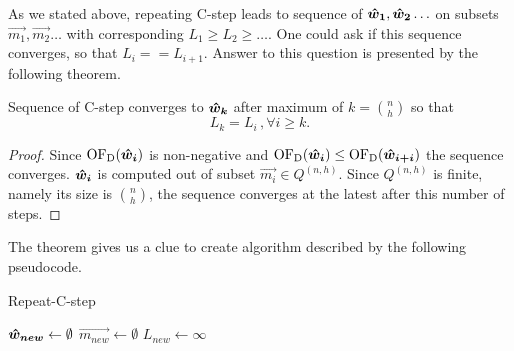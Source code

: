 As we stated above, repeating C-step leads to sequence of $\boldsymbol{\hat{w}_1}, \boldsymbol{\hat{w}_2} \ldots$ 
on subsets $\vec{m_1}, \vec{m_2} \ldots$ with corresponding 
$L_1 \geq L_2\geq \ldots$. One could ask if this sequence converges, so that $L_i == L_{i+1}$. 
Answer to this question is presented by the following theorem.




\begin{theorem}
    Sequence of C-step converges to $\boldsymbol{\hat{w}_{k}}$ after maximum of $k = {n \choose h}$ so that
\begin{equation}
    L_k = L_i \,, \forall i \geq k.
\end{equation}
\end{theorem}

\begin{proof}
    Since  $\operatorname{OF_D}(\boldsymbol{\hat{w}_{i}})$ is non-negative and $\operatorname{OF_D}(\boldsymbol{\hat{w}_{i}}) \leq \operatorname{OF_D}(\boldsymbol{\hat{w}_{i+i}})$ the sequence  converges. $\boldsymbol{\hat{w}_{i}}$  is computed out of subset 
    $\vec{m_i} \in Q^{(n, h)}$. Since $Q^{(n, h)}$ is finite,  namely its size is ${n \choose h}$, the sequence converges at the latest after this number of steps.
\end{proof}



The theorem gives us a clue to create algorithm described by the following pseudocode.

\begin{algorithm}[H]
    \label{alg:RepeatCstep}
    \caption{Repeat-C-step}
    $\boldsymbol{\hat{w}_{new}} \gets \emptyset$\;
    $\vec{m_{new}} \gets \emptyset$\;
    $L_{new} \gets \infty $\;


    \;
\end{algorithm}

